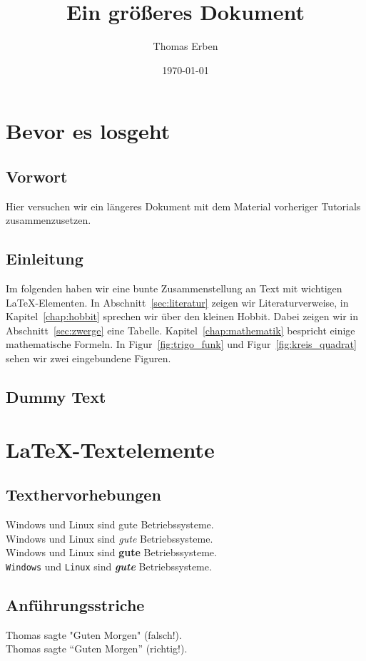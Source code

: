 \documentclass[12pt,a4paper,bibtotoc]{scrreprt}
\title{Ein größeres Dokument}
\author{Thomas Erben}
\date{\today}
\newcommand{\chapterref}[1]{Kapitel~\ref{#1}}
\newcommand{\sectionref}[1]{Abschnitt~\ref{#1}}
\newcommand{\figureref}[1]{Figur~\ref{#1}}
\begin{document}
%
\maketitle
%
\tableofcontents
%
\chapter{Bevor es losgeht}
%
\section{Vorwort}
Hier versuchen wir ein längeres Dokument mit dem Material vorheriger
Tutorials zusammenzusetzen.
%
\section{Einleitung}
Im folgenden haben wir eine bunte Zusammenstellung an Text mit
wichtigen \LaTeX{}-Elementen. In \sectionref{sec:literatur} zeigen wir
Literaturverweise, in \chapterref{chap:hobbit} sprechen wir über den
kleinen Hobbit. Dabei zeigen wir in
\sectionref{sec:zwerge} eine Tabelle. \chapterref{chap:mathematik}
bespricht einige mathematische Formeln. In \figureref{fig:trigo_funk} und
\figureref{fig:kreis_quadrat} sehen wir zwei eingebundene Figuren.
%
\section{Dummy Text}
\blindtext
\blindtext
%
\chapter{\LaTeX{}-Textelemente}
\label{chap:latex_elemente}
%
\section{Texthervorhebungen}
Windows und Linux sind gute Betriebssysteme.  \\
Windows und Linux sind \emph{gute} Betriebssysteme.  \\
Windows und Linux sind \textbf{gute} Betriebssysteme.  \\
\texttt{Windows} und \texttt{Linux} sind
\emph{\textbf{gute}} Betriebssysteme.  \\
%
\section{Anführungsstriche}
Thomas sagte "Guten Morgen" (falsch!). \\
Thomas sagte \enquote{Guten Morgen} (richtig!).
%
\end{document}
